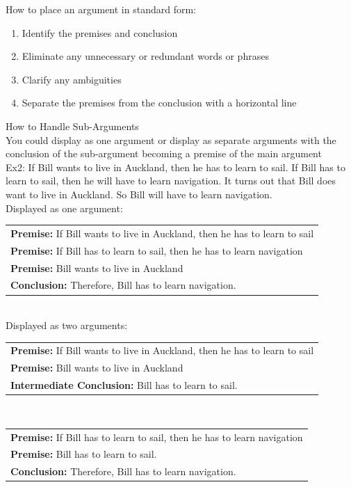 \documentclass[11pt, fleqn]{article}
\begin{document}
How to place an argument in standard form:
\begin{enumerate}
    \item Identify the premises and conclusion
    \item Eliminate any unnecessary or redundant words or phrases
    \item Clarify any ambiguities
    \item Separate the premises from the conclusion with a horizontal line
\end{enumerate}

How to Handle Sub-Arguments\\
You could display as one argument or display as separate arguments with the conclusion of the sub-argument becoming a premise of the main argument\\
Ex2: If Bill wants to live in Auckland, then he has to learn to sail. If Bill has to learn to sail, then he will have to learn navigation. It turns out that Bill does want to live in Auckland. So Bill will have to learn navigation.\\

Displayed as one argument:\\
\begin{tabular}{p{16cm}}
    \textbf{Premise: }If Bill wants to live in Auckland, then he has to learn to sail\\
    \textbf{Premise: }If Bill has to learn to sail, then he has to learn navigation\\
    \textbf{Premise: }Bill wants to live in Auckland\\
    \hline
    \textbf{Conclusion: }Therefore, Bill has to learn navigation.
\end{tabular}\\

Displayed as two arguments:\\
\begin{tabular}{p{16cm}}
    \textbf{Premise: }If Bill wants to live in Auckland, then he has to learn to sail\\
    \textbf{Premise: }Bill wants to live in Auckland\\
    \hline
    \textbf{Intermediate Conclusion: }Bill has to learn to sail.
\end{tabular}\\

\begin{tabular}{p{16cm}}
    \textbf{Premise: }If Bill has to learn to sail, then he has to learn navigation\\
    \textbf{Premise: }Bill has to learn to sail.\\
    \hline
    \textbf{Conclusion: }Therefore, Bill has to learn navigation.
\end{tabular}\\
\end{document}
